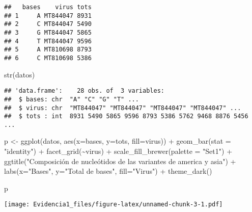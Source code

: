 \documentclass[
]{article}
\newenvironment{Shaded}{\begin{snugshade}}{\end{snugshade}}
\newcommand{\AttributeTok}[1]{\textcolor[rgb]{0.77,0.63,0.00}{#1}}
\newcommand{\FunctionTok}[1]{\textcolor[rgb]{0.00,0.00,0.00}{#1}}
\newcommand{\NormalTok}[1]{#1}
\newcommand{\OtherTok}[1]{\textcolor[rgb]{0.56,0.35,0.01}{#1}}
\newcommand{\SpecialCharTok}[1]{\textcolor[rgb]{0.00,0.00,0.00}{#1}}
\newcommand{\StringTok}[1]{\textcolor[rgb]{0.31,0.60,0.02}{#1}}
\begin{document}
\begin{verbatim}
##   bases    virus tots
## 1     A MT844047 8931
## 2     C MT844047 5490
## 3     G MT844047 5865
## 4     T MT844047 9596
## 5     A MT810698 8793
## 6     C MT810698 5386
\end{verbatim}

\begin{Shaded}
\begin{Highlighting}[]
\FunctionTok{str}\NormalTok{(datos)}
\end{Highlighting}
\end{Shaded}

\begin{verbatim}
## 'data.frame':    28 obs. of  3 variables:
##  $ bases: chr  "A" "C" "G" "T" ...
##  $ virus: chr  "MT844047" "MT844047" "MT844047" "MT844047" ...
##  $ tots : int  8931 5490 5865 9596 8793 5386 5762 9468 8876 5456 ...
\end{verbatim}

\begin{Shaded}
\begin{Highlighting}[]
\NormalTok{p }\OtherTok{\textless{}{-}} \FunctionTok{ggplot}\NormalTok{(datos, }\FunctionTok{aes}\NormalTok{(}\AttributeTok{x=}\NormalTok{bases, }\AttributeTok{y=}\NormalTok{tots, }\AttributeTok{fill=}\NormalTok{virus)) }\SpecialCharTok{+} \FunctionTok{geom\_bar}\NormalTok{(}\AttributeTok{stat =} \StringTok{"identity"}\NormalTok{) }\SpecialCharTok{+} \FunctionTok{facet\_grid}\NormalTok{(}\SpecialCharTok{\textasciitilde{}}\NormalTok{virus) }\SpecialCharTok{+} \FunctionTok{scale\_fill\_brewer}\NormalTok{(}\AttributeTok{palette =} \StringTok{"Set1"}\NormalTok{) }\SpecialCharTok{+} \FunctionTok{ggtitle}\NormalTok{(}\StringTok{"Composición de nucleótidos de las variantes de america y asia"}\NormalTok{) }\SpecialCharTok{+} \FunctionTok{labs}\NormalTok{(}\AttributeTok{x=}\StringTok{"Bases"}\NormalTok{, }\AttributeTok{y=}\StringTok{"Total de bases"}\NormalTok{, }\AttributeTok{fill=}\StringTok{"Virus"}\NormalTok{) }\SpecialCharTok{+} \FunctionTok{theme\_dark}\NormalTok{()}

\NormalTok{p}
\end{Highlighting}
\end{Shaded}

\texttt{[image: Evidencia1\_files/figure-latex/unnamed-chunk-3-1.pdf]}
\end{document}

